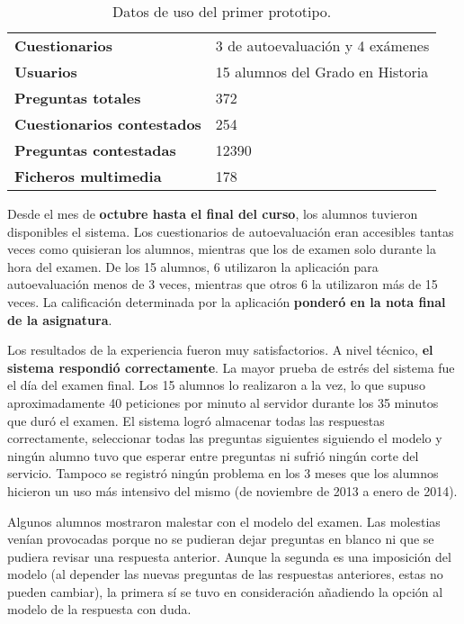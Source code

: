 \begin{table}[hc]
	\centering
	\begin{tabular}{l|l}
		{\bf Cuestionarios}             & 3 de autoevaluación y 4 exámenes \\ 
		{\bf Usuarios}                  & 15 alumnos del Grado en Historia \\
		{\bf Preguntas totales}         & 372                              \\ 
		{\bf Cuestionarios contestados} & 254                              \\ 
		{\bf Preguntas contestadas}     & 12390                            \\ 
		{\bf Ficheros multimedia}		& 178							   \\
	\end{tabular}
	\caption{Datos de uso del primer prototipo.}
\end{table}

Desde el mes de \textbf{octubre hasta el final del curso}, los alumnos tuvieron disponibles el sistema. Los cuestionarios de autoevaluación eran accesibles tantas veces como quisieran los alumnos, mientras que los de examen solo durante la hora del examen. De los 15 alumnos, 6 utilizaron la aplicación para autoevaluación menos de 3 veces, mientras que otros 6 la utilizaron más de 15 veces. La calificación determinada por la aplicación \textbf{ponderó en la nota final de la asignatura}.

Los resultados de la experiencia fueron muy satisfactorios. A nivel técnico, \textbf{el sistema respondió correctamente}. La mayor prueba de estrés del sistema fue el día del examen final. Los 15 alumnos lo realizaron a la vez, lo que supuso aproximadamente 40 peticiones por minuto al servidor durante los 35 minutos que duró el examen. El sistema logró almacenar todas las respuestas correctamente, seleccionar todas las preguntas siguientes siguiendo el modelo y ningún alumno tuvo que esperar entre preguntas ni sufrió ningún corte del servicio. Tampoco se registró ningún problema en los 3 meses que los alumnos hicieron un uso más intensivo del mismo (de noviembre de 2013 a enero de 2014).

Algunos alumnos mostraron malestar con el modelo del examen. Las molestias venían provocadas porque no se pudieran dejar preguntas en blanco ni que se pudiera revisar una respuesta anterior. Aunque la segunda es una imposición del modelo (al depender las nuevas preguntas de las respuestas anteriores, estas no pueden cambiar), la primera sí se tuvo en consideración añadiendo la opción al modelo de la respuesta con duda.

